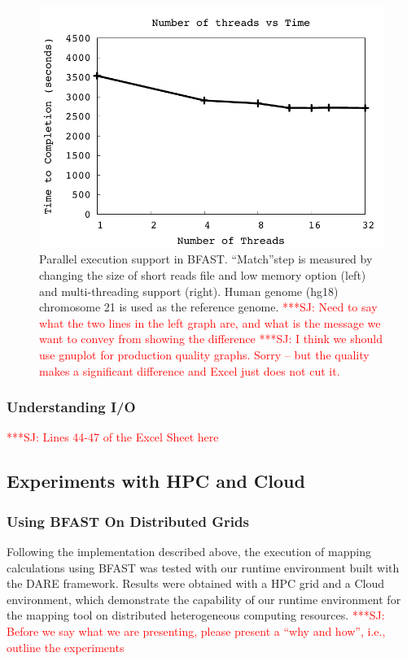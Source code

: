 \documentclass[12pt]{article}
\newcommand{\jhanote}[1]{ {\textcolor{red}     {***SJ: #1}}}
\newcommand{\jhanote}[1]{}
\begin{document}
 \begin{figure}
 \centering
\includegraphics[scale=0.66]{figures/threadsvstime.pdf} 

\caption{\small Parallel execution support in BFAST.  ``Match''step is measured by changing the size of short reads file and low memory option (left) and multi-threading support (right).  Human genome (hg18) chromosome 21 is used as the reference genome. \jhanote{Need to say what the two lines in the left graph are, and what is the message we want to convey from showing the difference} \jhanote{I think we should use gnuplot for production quality graphs. Sorry -- but the quality makes a significant difference and Excel just does not cut it.}}
  \label{fig:parallel-execution} 
 \end{figure}


\subsubsection{Understanding I/O}

\jhanote{Lines 44-47 of the Excel Sheet here}

\subsection{Experiments with HPC and Cloud}

\subsubsection{Using BFAST On Distributed Grids}

Following the implementation described above, the execution of mapping calculations using BFAST was tested with our runtime environment built with the DARE framework.   Results were obtained with a HPC grid and a Cloud environment, which demonstrate the capability of our runtime environment for the mapping tool on distributed heterogeneous computing resources. \jhanote{Before we say what we are presenting, please present a ``why and how'', i.e., outline the experiments} 
\end{document}
